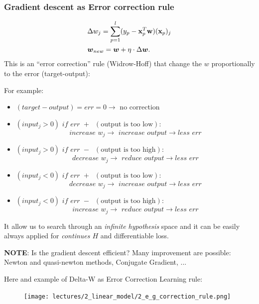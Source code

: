 \documentclass[../main.tex]{subfiles}
\begin{document}
\subsubsection*{Gradient descent as Error correction rule}
\[\begin{aligned}
&\Delta w_j = \sum_{p = 1}^{l} (y_p - \mathbf{x}_p^T\mathbf{w})(\mathbf{x}_p)_j\\
&\boldsymbol{w}_{new} = \boldsymbol{w} + \eta \cdot \Delta \boldsymbol{w}
.\end{aligned}\]
This is an “error correction” rule (Widrow-Hoff) that change the $w$ proportionally to the error (target-output):

For example:
\begin{itemize}
    \item $(target - output) = err=0 \rightarrow$ no correction
    
    \item $(input_j>0)\,\, if\,\,err\,\,+ \;\; (\text{output is too low}):$
    $$increase\,\, w_j \rightarrow\,\, increase\,\, output \rightarrow less\,\, err$$
    
    \item $(input_j>0)\,\, if\,\,err\,\,-\;\;(\text{output is too high}): $
    $$decrease\,\, w_j \rightarrow\,\, reduce\,\, output \rightarrow less\,\, err$$

    \item $(input_j<0)\,\, if\,\,err\,\,+\;\;(\text{output is too low}): $
    $$decrease\,\, w_j \rightarrow\,\, increase\,\, output \rightarrow less\,\, err$$  

    \item $(input_j<0)\,\, if\,\,err\,\,- \;\; (\text{output is too high}):$
    $$increase\,\, w_j \rightarrow\,\, reduce\,\, output \rightarrow less\,\, err$$
\end{itemize}
It allow us to search through an \emph{infinite hypothesis} space and it can be easily always applied for \emph{continues $H$} and differentiable loss.

\textbf{NOTE}: Is the gradient descent efficient? Many improvement are possible: Newton and quasi-newton methods, Conjugate Gradient, ...

Here and example of Delta-W as Error Correction Learning rule:
\begin{figure}[H]
    \centering
    \texttt{[image: lectures/2\_linear\_model/2\_e\_g\_correction\_rule.png]}
\end{figure}
\end{document}

